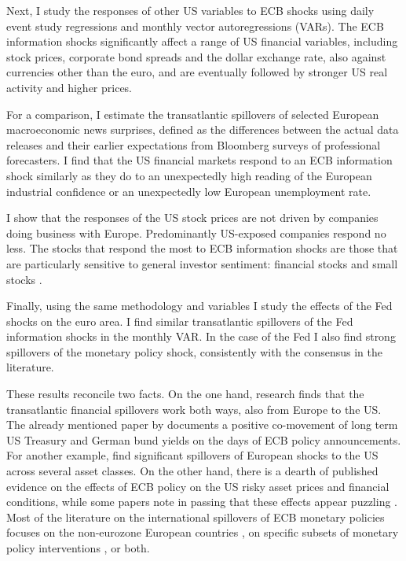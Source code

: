 \documentclass[a4paper,12pt]{article}
\begin{document}
Next, I study the responses of other US variables to ECB shocks
using daily event study regressions and monthly vector autoregressions (VARs).
The ECB information shocks significantly affect a range of US financial variables, 
including stock prices, corporate bond spreads and the dollar exchange rate, also against currencies
other than the euro, and are eventually followed by stronger US real activity and higher prices.

For a comparison, I estimate the transatlantic spillovers of selected European macroeconomic news surprises,
defined as the differences between the actual data releases and their earlier expectations from Bloomberg surveys of professional forecasters.
I find that the US financial markets respond to an ECB information shock similarly as they do
to an unexpectedly high reading of the European industrial confidence or an unexpectedly low European unemployment rate.

I show that the responses of the US stock prices are not driven by companies doing business with Europe.
Predominantly US-exposed companies respond no less. The stocks that respond the most to ECB information shocks are those that are particularly sensitive to general investor sentiment: financial stocks and small stocks \citep{Baker_Wurgler_2006}.

Finally, using the same methodology and variables I study the effects of the Fed shocks on the euro area. I find similar transatlantic spillovers of the Fed information shocks in the monthly VAR.
In the case of the Fed I also find strong spillovers of the monetary policy shock, consistently with the consensus in the literature.

These results reconcile two facts. On the one hand, research finds that the transatlantic financial spillovers work both ways, also from Europe to the US. The already mentioned paper by 
\cite{Curcuru_etal_2018} documents a positive co-movement of long term US Treasury and German bund yields on the days of ECB policy announcements. 
For another example, \cite{Ehrmann_etal_2011} find significant spillovers of European shocks to the US across several asset classes.
On the other hand, there is a dearth of published evidence on the effects of ECB policy on the US risky asset prices and financial conditions, while
some papers note in passing that these effects appear puzzling \citep[e.g.][]{Rogers_Scotti_Wright_2014,Brusa_etal_2020}.
Most of the literature on the international spillovers of ECB monetary policies focuses on the non-eurozone European countries \citep[e.g.][]{Bluwstein_Canova_2016,Moder_2019,Feldkircher_etal_2020,terEllen_etal_2020,Corsetti_etal_2021},
on specific subsets of monetary policy interventions \citep{Georgiadis_Grab_2016}, or both.
\end{document}
